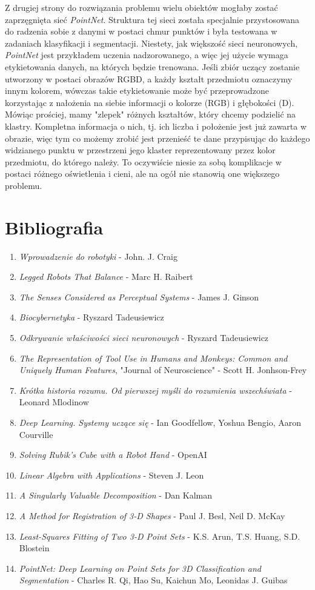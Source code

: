 \documentclass[12pt]{article}
\begin{document}
Z drugiej strony do rozwiązania problemu wielu obiektów mogłaby zostać zaprzęgnięta sieć \emph{PointNet}. Struktura tej sieci została specjalnie przystosowana do radzenia sobie z danymi w postaci chmur punktów i była testowana w zadaniach klasyfikacji i segmentacji. Niestety, jak większość sieci neuronowych, \emph{PointNet} jest przykładem uczenia nadzorowanego, a więc jej użycie wymaga etykietowania danych, na których będzie trenowana. Jeśli zbiór uczący zostanie utworzony w postaci obrazów RGBD, a każdy kształt przedmiotu oznaczymy innym kolorem, wówczas takie etykietowanie może być przeprowadzone korzystając z nałożenia na siebie informacji o kolorze (RGB) i głębokości (D). Mówiąc prościej, mamy "zlepek" różnych kształtów, który chcemy podzielić na klastry. Kompletna informacja o nich, tj. ich liczba i położenie jest już zawarta w obrazie, więc tym co możemy zrobić jest przenieść te dane przypisując do każdego widzianego punktu w przestrzeni jego klaster reprezentowany przez kolor przedmiotu, do którego należy. To oczywiście niesie za sobą komplikacje w postaci różnego oświetlenia i cieni, ale na ogół nie stanowią one większego problemu.

\newpage
\section*{Bibliografia}
\begin{enumerate}
\item \emph{Wprowadzenie do robotyki} - John. J. Craig
\item \emph{Legged Robots That Balance} - Marc H. Raibert
\item \emph{The Senses Considered as Perceptual Systems} - James J. Ginson
\item \emph{Biocybernetyka} - Ryszard Tadeusiewicz
\item \emph{Odkrywanie właściwości sieci neuronowych} - Ryszard Tadeusiewicz
\item \emph{The Representation of Tool Use in Humans and Monkeys: Common and Uniquely Human Features}, "Journal of Neuroscience" - Scott H. Jonhson-Frey
\item \emph{Krótka historia rozumu. Od pierwszej myśli do rozumienia wszechświata} - Leonard Mlodinow
\item \emph{Deep Learning. Systemy uczące się} - Ian Goodfellow, Yoshua Bengio, Aaron Courville
\item \emph{Solving Rubik's Cube with a Robot Hand} - OpenAI
\item \emph{Linear Algebra with Applications} - Steven J. Leon
\item \emph{A Singularly Valuable Decomposition} - Dan Kalman
\item \emph{A Method for Registration of 3-D Shapes} - Paul J. Besl, Neil D. McKay
\item \emph{Least-Squares Fitting of Two 3-D Point Sets} - K.S. Arun, T.S. Huang, S.D. Blostein
\item \emph{PointNet: Deep Learning on Point Sets for 3D Classification and Segmentation} - Charles R. Qi, Hao Su, Kaichun Mo, Leonidas J. Guibas
\end{enumerate}
\end{document}
